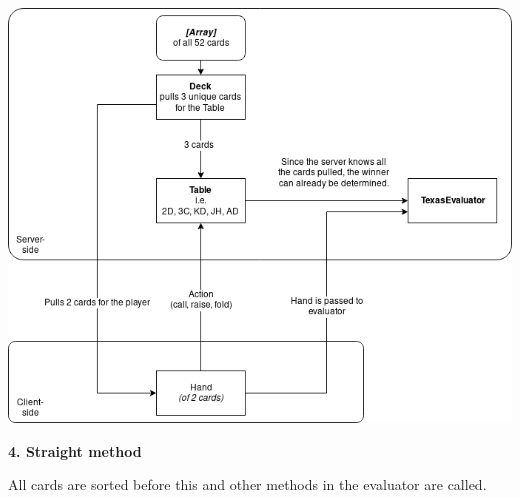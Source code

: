 \documentclass[11pt]{article}
\begin{document}
\includegraphics[width=\textwidth]{wholesystem}


\newpage 

\textbf{4. Straight method}

All cards are sorted before this and other methods in the evaluator are called.
\end{document}
